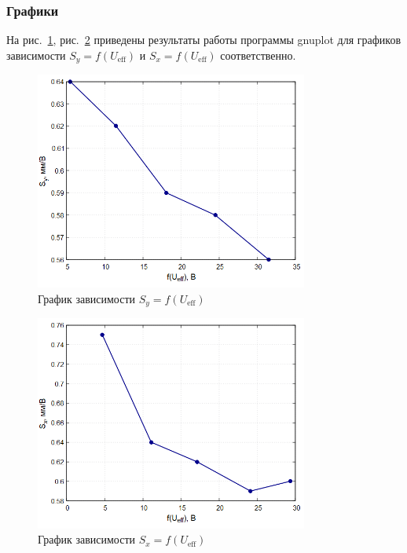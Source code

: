 \subsubsection{Графики}

На рис.~\ref{fig:plot1}, рис.~\ref{fig:plot2} приведены результаты работы программы gnuplot для графиков зависимости $S_y = f(U_{\text{eff}})$ и $S_x = f(U_{\text{eff}})$ соответственно.

\begin{figure}[H]
\centering
\includegraphics[width=0.8\textwidth]{plot1.png}
\caption{График зависимости $S_y = f(U_{\text{eff}})$}
\label{fig:plot1}
\end{figure}

\begin{figure}[H]
\centering
\includegraphics[width=0.8\textwidth]{plot2.png}
\caption{График зависимости $S_x = f(U_{\text{eff}})$}
\label{fig:plot2}
\end{figure}

